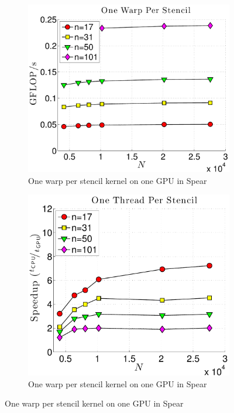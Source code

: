 \begin{figure}
\begin{subfigure}[t]{0.425\textwidth}
\includegraphics[width=1.0\textwidth]{../figures/spear_results/vortex/gflops_gpu_1proc_oneWarpPerStencil-eps-converted-to.pdf}
\caption{One warp per stencil kernel on one GPU in Spear}
\label{fig:spear_alltoall_1proc_warp}
\end{subfigure} 
\begin{subfigure}[t]{0.425\textwidth}
\includegraphics[width=1.0\textwidth]{../figures/spear_results/vortex/speedup_1proc_oneThreadPerStencil-eps-converted-to.pdf}
\caption{One warp per stencil kernel on one GPU in Spear}
\label{fig:spear_alltoall_1proc_warp}
\end{subfigure} 
\end{figure} 

